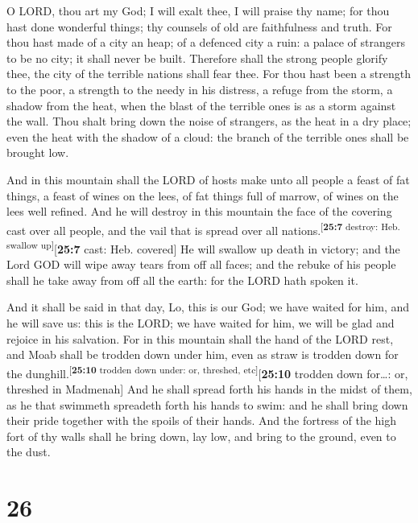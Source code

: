  O LORD, thou art my God; I will exalt thee, I will praise
thy name; for thou hast done wonderful things; thy counsels of old are
faithfulness and truth.  For thou hast made of a city an
heap; of a defenced city a ruin: a palace of strangers to be no city; it
shall never be built.  Therefore shall the strong people
glorify thee, the city of the terrible nations shall fear thee.
 For thou hast been a strength to the poor, a strength to
the needy in his distress, a refuge from the storm, a shadow from the
heat, when the blast of the terrible ones is as a storm against the
wall.  Thou shalt bring down the noise of strangers, as
the heat in a dry place; even the heat with the shadow of a cloud: the
branch of the terrible ones shall be brought low.

 And in this mountain shall the LORD of hosts make unto
all people a feast of fat things, a feast of wines on the lees, of fat
things full of marrow, of wines on the lees well refined. 
And he will destroy in this mountain the face of the covering cast over
all people, and the vail that is spread over all
nations.\textsuperscript{{[}\textbf{25:7} destroy: Heb. swallow
up{]}}{[}\textbf{25:7} cast: Heb. covered{]}  He will
swallow up death in victory; and the Lord GOD will wipe away tears from
off all faces; and the rebuke of his people shall he take away from off
all the earth: for the LORD hath spoken it.

 And it shall be said in that day, Lo, this is our God; we
have waited for him, and he will save us: this is the LORD; we have
waited for him, we will be glad and rejoice in his salvation.
 For in this mountain shall the hand of the LORD rest,
and Moab shall be trodden down under him, even as straw is trodden down
for the dunghill.\textsuperscript{{[}\textbf{25:10} trodden down under:
or, threshed, etc{]}}{[}\textbf{25:10} trodden down for\ldots: or,
threshed in Madmenah{]}  And he shall spread forth his
hands in the midst of them, as he that swimmeth spreadeth forth his
hands to swim: and he shall bring down their pride together with the
spoils of their hands.  And the fortress of the high fort
of thy walls shall he bring down, lay low, and bring to the ground, even
to the dust.

\hypertarget{section-25}{%
\section{26}\label{section-25}}


